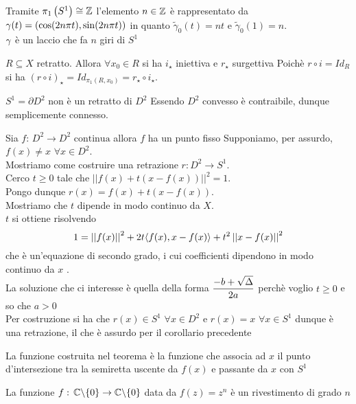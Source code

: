 \begin{oss}Tramite $\pi_1\left( S^1 \right) \cong \mathbb{Z}$ l'elemento $n\in \mathbb{Z}$ \`e rappresentato da $\gamma(t)=( \cos (2n\pi t ) , \sin (2 n \pi t))$ in quanto $\tilde{\gamma}_0(t)=nt$ e $\tilde{\gamma}_0(1)=n$.\\
$\gamma$ \`e un laccio  che fa $n$ giri di $S^1$
\end{oss}
\begin{prop}$R\subseteq X$ retratto. Allora $\forall x_0\in R$ si ha $i_\star$ iniettiva e $r_\star$ surgettiva
\proof Poich\`e $r\circ i = Id_R $ si ha $(r \circ i )_\star=Id_{\pi_1(R,x_0)}= r_\star \circ i_\star$.
\end{prop}
\begin{cor}$S^1=\partial D^2$ non \`e un retratto di $D^2$
\proof Essendo $D^2$ convesso \`e contraibile, dunque semplicemente connesso.\\
\end{cor}
\begin{thm}\bianco
Sia $f:\, D^2 \to D^2 \text{ continua}$ allora $f$ ha un punto fisso
\proof Supponiamo, per assurdo, $f(x) \neq x \, \, \forall x\in D^2$.\\
Mostriamo come costruire una retrazione $r:D^2\to S^1$.\\
Cerco $t\geq 0$ tale che $\left\vert \left \vert  f(x)+t(x-f(x))  \right \vert \right\vert ^2=1$.\\
Pongo dunque $r(x)=f(x)+t(x-f(x))$.\\
Mostriamo che $t$ dipende in modo continuo da $X$.\\
$t$ si ottiene risolvendo 
$$ 1=\left\vert\left\vert f(x) \right\vert \right\vert^2+2t\langle f(x), x-f(x)\rangle + t^2 \left\vert\left\vert x-f(x) \right\vert \right\vert^2$$
che \`e un'equazione di secondo grado, i cui coefficienti dipendono in modo continuo da $x$ .\\
La soluzione che ci interesse \`e quella della forma $\displaystyle \frac{-b+\sqrt{\Delta}}{2a}$ perch\`e voglio $t\geq 0 $ e so che $ a>0$ \\
Per costruzione si ha che $r(x)\in S^1 \, \, \forall x \in D^2$ e $r(x)=x \,\, \forall x\in S^1$ dunque \`e una retrazione, il che \`e assurdo per il corollario precedente
\end{thm}
\begin{oss}La funzione costruita nel teorema \`e la funzione che associa ad $x$ il punto d'intersezione tra la semiretta uscente da $f(x)$ e passante da $x$ con $S^1$
\end{oss}
\begin{ex}La funzione $f:\, \mathbb{C} \backslash \{ 0\}\to \mathbb{C} \backslash\{ 0 \} $ data da $f(z)=z^n$ \`e un rivestimento di grado $n$
\end{ex}
